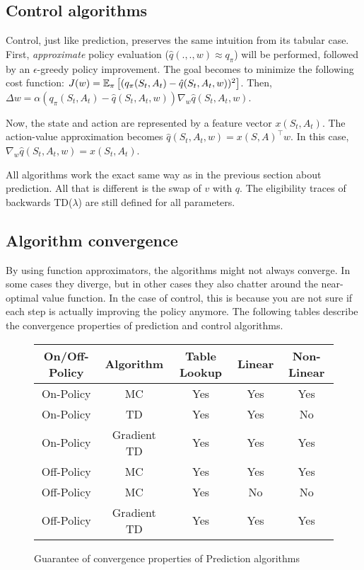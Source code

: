 \subsection{Control algorithms}

Control, just like prediction, preserves the same intuition from its tabular case. First, \textit{approximate} policy evaluation ($\hat{q}(., ., w) \approx q_\pi$) will be performed, followed by an $\epsilon$-greedy policy improvement. The goal becomes to minimize the following cost function: $J(w) = \operatorname{\mathbb{E}}_\pi \left[(q_\pi(S_t, A_t) - \hat{q}(S_t, A_t, w))^2\right]$. Then, $\Delta w = \alpha (q_\pi(S_t, A_t) - \hat{q}(S_t, A_t, w)) \nabla_w \hat{q}(S_t, A_t, w)$.

Now, the state and action are represented by a feature vector $x(S_t, A_t)$. The action-value approximation becomes $\hat{q}(S_t, A_t, w) = x(S, A)^\intercal w$. In this case, $\nabla_w \hat{q}(S_t, A_t, w) = x(S_t, A_t)$.

All algorithms work the exact same way as in the previous section about prediction. All that is different is the swap of $v$ with $q$. The eligibility traces of backwards TD($\lambda$) are still defined for all parameters.

\subsection{Algorithm convergence}

By using function approximators, the algorithms might not always converge. In some cases they diverge, but in other cases they also chatter around the near-optimal value function. In the case of control, this is because you are not sure if each step is actually improving the policy anymore. The following tables describe the convergence properties of prediction and control algorithms.

\begin{figure}[H]
	\centering
	\begin{tabular}{| c | c | c | c | c |}
		\hline
		On/Off-Policy & Algorithm & Table Lookup & Linear & Non-Linear\\
		\hline
		\hline
		On-Policy & MC & Yes & Yes & Yes\\
		\hline
		On-Policy & TD & Yes & Yes & No\\
		\hline
		On-Policy & Gradient TD & Yes & Yes & Yes\\
		\hline
		Off-Policy & MC & Yes & Yes & Yes\\
		\hline
		Off-Policy & MC & Yes & No & No\\
		\hline
		Off-Policy & Gradient TD & Yes & Yes & Yes\\
		\hline
	\end{tabular}
	\caption{Guarantee of convergence properties of Prediction algorithms}
\end{figure}

